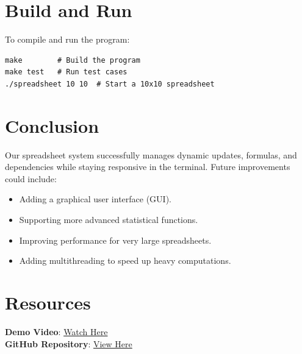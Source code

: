 \documentclass{article}
\begin{document}
\section{Build and Run}
To compile and run the program:
\begin{lstlisting}
make        # Build the program
make test   # Run test cases
./spreadsheet 10 10  # Start a 10x10 spreadsheet
\end{lstlisting}

\section{Conclusion}
Our spreadsheet system successfully manages dynamic updates, formulas, and dependencies while staying responsive in the terminal. Future improvements could include:
\begin{itemize}
    \item Adding a graphical user interface (GUI).
    \item Supporting more advanced statistical functions.
    \item Improving performance for very large spreadsheets.
    \item Adding multithreading to speed up heavy computations.
\end{itemize}

\section{Resources}
\textbf{Demo Video}: \href{https://csciitd-my.sharepoint.com/:v:/g/personal/cs1230022_iitd_ac_in/EXgOR30dMR9BsSB2J4SxpDwBgEBZ_Gd9vvusJtjzyfl6AQ?e=em4oGV&nav=eyJyZWZlcnJhbEluZm8iOnsicmVmZXJyYWxBcHAiOiJTdHJlYW1XZWJBcHAiLCJyZWZlcnJhbFZpZXciOiJTaGFyZURpYWxvZy1MaW5rIiwicmVmZXJyYWxBcHBQbGF0Zm9ybSI6IldlYiIsInJlZmVycmFsTW9kZSI6InZpZXcifX0%3D}{Watch Here}\\
\textbf{GitHub Repository}: \href{https://github.com/subCode321/COP290---Spring-2025.git}{View Here}
\end{document}

